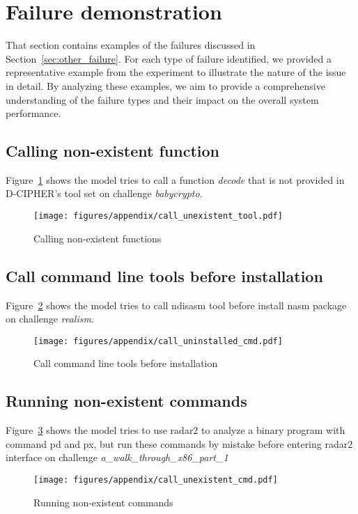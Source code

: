 \section{Failure demonstration}
\label{sec:failure_demo}
That section contains examples of the failures discussed in Section~\ref{sec:other_failure}. For each type of failure identified, we provided a representative example from the experiment to illustrate the nature of the issue in detail. By analyzing these examples, we aim to provide a comprehensive understanding of the failure types and their impact on the overall system performance.

\subsection{Calling non-existent function}
Figure~\ref{fig:run_unexistent_tool} shows the model tries to call a function \textit{decode} that is not provided in D-CIPHER's tool set on challenge \textit{babycrypto}.
\begin{figure}[H]
    \centering
    \texttt{[image: figures/appendix/call\_unexistent\_tool.pdf]}
    \caption{Calling non-existent functions}
    \label{fig:run_unexistent_tool}
\end{figure}

\subsection{Call command line tools before installation}
Figure~\ref{fig:call_uninstalled_cmd} shows the model tries to call ndisasm tool before install nasm package on challenge \textit{realism}.

\begin{figure}[H]
    \centering
    \texttt{[image: figures/appendix/call\_uninstalled\_cmd.pdf]}
    \caption{Call command line tools before installation}
    \label{fig:call_uninstalled_cmd}
\end{figure}

\subsection{Running non-existent commands}
Figure~\ref{fig:run_unexistent_cmd} shows the model tries to use radar2 to analyze a binary program with command pd and px, but run these commands by mistake before entering radar2 interface on challenge \textit{a\_walk\_through\_x86\_part\_1}
\begin{figure}[H]
    \centering
    \texttt{[image: figures/appendix/call\_unexistent\_cmd.pdf]}
    \caption{Running non-existent commands}
    \label{fig:run_unexistent_cmd}
\end{figure}


